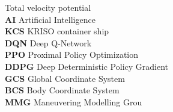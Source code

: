 \abbreviations
\noindent
{}   \> Total velocity potential \\
\textbf{AI}   \> Artificial Intelligence \\
\textbf{KCS} \> KRISO container ship\\
\textbf{DQN} \>Deep Q-Network \\
\textbf{PPO} \> Proximal Policy Optimization \\
\textbf{DDPG}   \> Deep Deterministic Policy Gradient \\
\textbf{GCS} \> Global Coordinate System \\
\textbf{BCS} \> Body Coordinate System \\
 \textbf{MMG} \> Maneuvering Modelling Grou